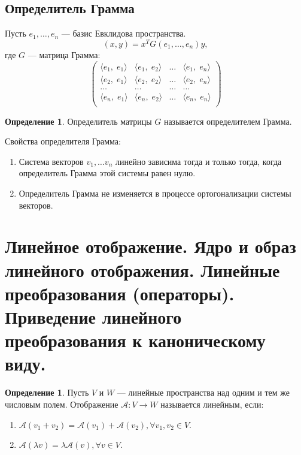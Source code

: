 \documentclass[12pt]{report}
\theoremstyle{definition}
\newtheorem{definition}[theorem]{Определение}
\newcommand{\A}{\mathcal A}
\begin{document}
\subsection{Определитель Грамма}
Пусть $e_1, \dots, e_n$ --- базис Евклидова пространства.
$$
(x, y) = x^T G(e_1, \dots, e_n) y,
$$
где $G$ --- матрица Грамма:
$$
\begin{pmatrix} 
\langle e_1,\;e_1\rangle & \langle e_1,\;e_2\rangle & \ldots & \langle e_1,\;e_n\rangle \\ 
\langle e_2,\;e_1\rangle & \langle e_2,\;e_2\rangle & \ldots & \langle e_2,\;e_n\rangle \\ 
\ldots & \ldots & \ldots & \ldots \\ 
\langle e_n,\;e_1\rangle & \langle e_n,\;e_2\rangle & \ldots & \langle e_n,\;e_n\rangle \\ 
\end{pmatrix}
$$

\begin{definition}
Определитель матрицы $G$ называется определителем Грамма.
\end{definition}

Свойства определителя Грамма:
\begin{enumerate}
\item Система векторов $v_1, \dots v_n$ линейно зависима тогда
  и только тогда, когда определитель Грамма этой системы равен нулю.
\item Определитель Грамма не изменяется в процессе ортогонализации системы
векторов.
\end{enumerate}


\section
{
  Линейное отображение. Ядро и образ линейного отображения.
  Линейные преобразования (операторы).
  Приведение линейного преобразования к каноническому виду.
}

\begin{definition}
Пусть $V$ и $W$ --- линейные пространства над одним и тем
же числовым полем. Отображение $\A: V \rightarrow W$
называется линейным, если:
\begin{enumerate}
\item $\A(v_1 + v_2) = \A(v_1) + \A(v_2), \forall v_1, v_2 \in V$.
\item $\A(\lambda v) = \lambda \A(v), \forall v \in V$.
\end{enumerate}
\end{definition}
\end{document}
